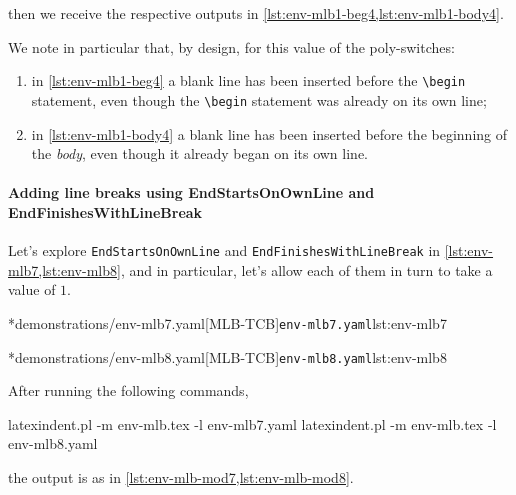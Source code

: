 		then we receive the respective outputs in \cref{lst:env-mlb1-beg4,lst:env-mlb1-body4}.

		\begin{cmhtcbraster}[raster column skip=.1\linewidth]
		\end{cmhtcbraster}

		We note in particular that, by design, for this value of the poly-switches:
		\begin{enumerate}
			\item in \cref{lst:env-mlb1-beg4} a blank line has been inserted before the
			      \lstinline!\begin! statement, even though the \lstinline!\begin!
			      statement was already on its own line;
			\item in \cref{lst:env-mlb1-body4} a blank line has been inserted before the beginning of the
			      \emph{body}, even though it already began on its own line.
		\end{enumerate}

	\paragraph{Adding line breaks using EndStartsOnOwnLine and EndFinishesWithLineBreak}
		Let's explore \texttt{EndStartsOnOwnLine} and \texttt{EndFinishesWithLineBreak} in
		\cref{lst:env-mlb7,lst:env-mlb8}, and in particular, let's allow each of them in turn to
		take a value of $1$.

		\begin{minipage}{.49\textwidth}
			\cmhlistingsfromfile[style=yaml-LST]*{demonstrations/env-mlb7.yaml}[MLB-TCB]{\texttt{env-mlb7.yaml}}{lst:env-mlb7}
		\end{minipage}
		\hfill
		\begin{minipage}{.49\textwidth}
			\cmhlistingsfromfile[style=yaml-LST]*{demonstrations/env-mlb8.yaml}[MLB-TCB]{\texttt{env-mlb8.yaml}}{lst:env-mlb8}
		\end{minipage}

		After running the following commands,
		\begin{commandshell}
latexindent.pl -m env-mlb.tex -l env-mlb7.yaml
latexindent.pl -m env-mlb.tex -l env-mlb8.yaml
\end{commandshell}
		the output is as in \cref{lst:env-mlb-mod7,lst:env-mlb-mod8}.

